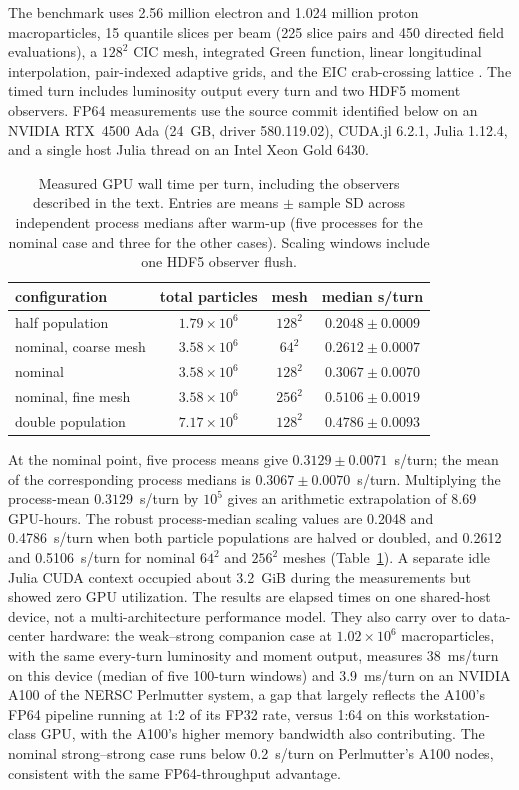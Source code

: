 \documentclass[a4paper,fleqn]{cas-sc}
\begin{document}
The benchmark uses 2.56 million electron and 1.024 million proton
macroparticles, 15 quantile slices per beam (225 slice pairs and 450
directed field evaluations), a $128^2$ CIC mesh, integrated Green function,
linear longitudinal interpolation, pair-indexed adaptive grids, and the EIC
crab-crossing lattice \citep{EICCDR2021}.  The timed turn includes luminosity
output every turn and two HDF5 moment observers.  FP64 measurements use the
source commit identified below on an
NVIDIA RTX~4500 Ada (24~GB, driver 580.119.02), CUDA.jl 6.2.1, Julia 1.12.4,
and a single host Julia thread on an Intel Xeon Gold 6430.

\begin{table}[pos=h]
\centering
\caption{Measured GPU wall time per turn, including the observers described in
the text.  Entries are means $\pm$ sample SD across independent process
medians after warm-up (five processes for the nominal case and three for the
other cases).  Scaling windows include one HDF5 observer flush.}
\label{tab:performance}
\begin{tabular}{lccc}
\toprule
configuration & total particles & mesh & median s/turn \\
\midrule
half population & $1.79\times10^6$ & $128^2$ &
$0.2048\pm0.0009$ \\
nominal, coarse mesh & $3.58\times10^6$ & $64^2$ &
$0.2612\pm0.0007$ \\
nominal & $3.58\times10^6$ & $128^2$ &
$0.3067\pm0.0070$ \\
nominal, fine mesh & $3.58\times10^6$ & $256^2$ &
$0.5106\pm0.0019$ \\
double population & $7.17\times10^6$ & $128^2$ &
$0.4786\pm0.0093$ \\
\bottomrule
\end{tabular}
\end{table}

At the nominal point, five process means give $0.3129\pm0.0071$~s/turn;
the mean of the corresponding process medians is
$0.3067\pm0.0070$~s/turn.
Multiplying the process-mean $0.3129$~s/turn by $10^5$ gives an arithmetic
extrapolation of 8.69 GPU-hours.  The robust process-median scaling values are 0.2048 and
0.4786~s/turn when both particle populations are halved or doubled, and
0.2612 and 0.5106~s/turn for nominal $64^2$ and $256^2$ meshes
(Table~\ref{tab:performance}).
A separate idle Julia CUDA context occupied about 3.2~GiB during the
measurements but showed zero GPU utilization.  The results are elapsed times
on one shared-host device, not a multi-architecture performance model.
They also carry over to data-center hardware: the
weak--strong companion case at $1.02\times10^6$ macroparticles, with the
same every-turn luminosity and moment output, measures 38~ms/turn on this
device (median of five 100-turn windows) and
3.9~ms/turn on an NVIDIA A100 of the NERSC Perlmutter system, a gap that
largely reflects the A100's FP64
pipeline running at 1:2 of its FP32 rate, versus 1:64 on this
workstation-class GPU, with the A100's higher memory bandwidth also
contributing.  The nominal strong--strong case runs below 0.2~s/turn on
Perlmutter's A100 nodes, consistent with the same FP64-throughput
advantage.
\end{document}

